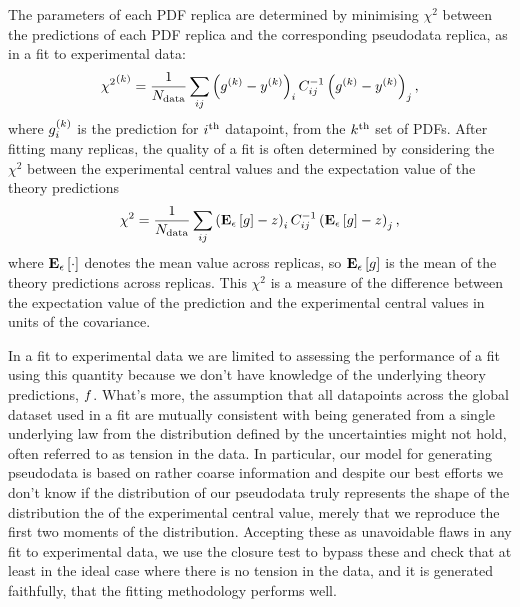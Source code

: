 The parameters of each PDF replica are determined by minimising $\chi^2$ between
the predictions of each PDF replica and the corresponding pseudodata replica,
as in a fit to experimental data:
\begin{equation}
    {\chi^2}^{(k)} = \frac{1}{N_{\rm data}} \sum_{ij} \left( g^{(k)} - y^{(k)} \right)_i C^{-1}_{ij} \left( g^{(k)} - y^{(k)} \right)_j,
\end{equation}
where $g^{(k)}_i$ is the prediction for $i^{\rm th}$ datapoint, from
the $k^{\rm th}$ set of PDFs. After fitting many replicas, the quality of a fit
is often determined by considering the $\chi^2$ between the experimental central
values and the expectation value of the theory predictions
\begin{equation}\label{eq:centralchi2}
    \chi^2 = \frac{1}{N_{\rm data}} \sum_{ij} \left( \mathbf{E}_{\epsilon}\left[ g \right] - z \right)_i C^{-1}_{ij} \left( \mathbf{E}_{\epsilon}\left[ g \right] - z \right)_j,
\end{equation}
where $\mathbf{E}_{\epsilon}\left[ \cdot \right]$ denotes the mean value across replicas, so $\mathbf{E}_{\epsilon}\left[ g \right]$ is
the mean of the theory predictions across replicas. This $\chi^2$ is a measure
of the difference between the expectation value of the prediction and the
experimental central values in units of the covariance.

In a fit to experimental data we are limited to assessing the performance of a fit
using this quantity because we don't
have knowledge of the underlying theory predictions, $f$. What's more, the
assumption that all datapoints across the global dataset used in a fit are
mutually consistent with being generated from a single underlying law from
the distribution defined by the uncertainties might not hold, often
referred to as tension in the data. In particular, our model for generating pseudodata
is based on rather coarse information and despite our best efforts we don't know
if the distribution of our pseudodata truly represents the shape of the distribution
the of the experimental central value, merely that we reproduce the first
two moments of the distribution. Accepting these as unavoidable flaws in any
fit to experimental data, we use the closure test to bypass these and check that
at least in the ideal case where there is no tension in the data, and it is
generated faithfully, that the fitting methodology performs well.
